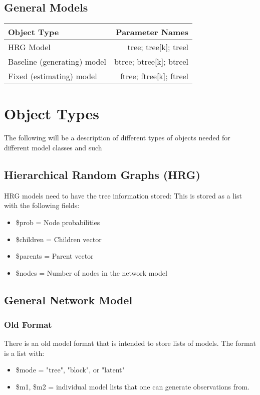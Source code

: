 \documentclass[11pt]{article}
\begin{document}
\subsection{General Models}
\begin{tabular}{|l|r|}
\hline
{\bf Object Type} & {\bf Parameter Names} \\


\hline
HRG Model & tree; tree[k]; treel \\
\hline
Baseline (generating) model & btree; btree[k]; btreel \\
\hline
Fixed (estimating) model & ftree; ftree[k]; ftreel \\

\hline
\end{tabular}


\section{Object Types}
The following will be a description of different types of objects needed for different model classes and such
\subsection{Hierarchical Random Graphs (HRG)}
HRG models need to have the tree information stored: This is stored as a list with the following fields: 
\begin{itemize}
\item \$prob = Node probabilities
\item \$children = Children vector
\item \$parents = Parent vector 
\item \$nodes = Number of nodes in the network model
\end{itemize}

\subsection{General Network Model}
\subsubsection{Old Format}
There is an old model format that is intended to store lists of models. The format is a list with: 
\begin{itemize}


\item \$mode = "tree", "block", or "latent"
\item \$m1, \$m2 = individual model lists that one can generate observations from. 
\end{itemize}
\end{document}
